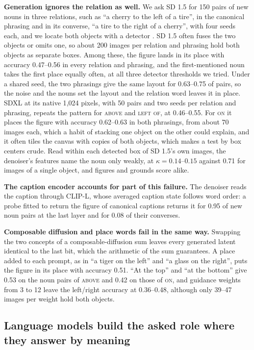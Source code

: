 \documentclass[10pt]{article}
\theoremstyle{plain}
\theoremstyle{remark}
\begin{document}
\textbf{Generation ignores the relation as well.} We ask SD 1.5 for 150 pairs of new nouns in three relations, such as ``a cherry to the left of a tire'', in the canonical phrasing and in its converse, ``a tire to the right of a cherry'', with four seeds each, and we locate both objects with a detector \citep{liu2024groundingdino}. SD 1.5 often fuses the two objects or omits one, so about 200 images per relation and phrasing hold both objects as separate boxes. Among these, the figure lands in its place with accuracy 0.47--0.56 in every relation and phrasing, and the first-mentioned noun takes the first place equally often, at all three detector thresholds we tried. Under a shared seed, the two phrasings give the same layout for 0.63--0.75 of pairs, so the noise and the nouns set the layout and the relation word leaves it in place. SDXL at its native 1{,}024 pixels, with 50 pairs and two seeds per relation and phrasing, repeats the pattern for \textsc{above} and \textsc{left of}, at 0.46--0.55. For \textsc{on} it places the figure with accuracy 0.62--0.63 in both phrasings, from about 70 images each, which a habit of stacking one object on the other could explain, and it often tiles the canvas with copies of both objects, which makes a test by box centers crude. Read within each detected box of SD 1.5's own images, the denoiser's features name the noun only weakly, at $\kappa = 0.14$--$0.15$ against 0.71 for images of a single object, and figures and grounds score alike.

\textbf{The caption encoder accounts for part of this failure.} The denoiser reads the caption through CLIP-L, whose averaged caption state follows word order: a probe fitted to return the figure of canonical captions returns it for 0.95 of new noun pairs at the last layer and for 0.08 of their converses.

\textbf{Composable diffusion and place words fail in the same way.} Swapping the two concepts of a composable-diffusion sum leaves every generated latent identical to the last bit, which the arithmetic of the sum guarantees. A place added to each prompt, as in ``a tiger on the left'' and ``a glass on the right'', puts the figure in its place with accuracy 0.51. ``At the top'' and ``at the bottom'' give 0.53 on the noun pairs of \textsc{above} and 0.42 on those of \textsc{on}, and guidance weights from 3 to 12 leave the left/right accuracy at 0.36--0.48, although only 39--47 images per weight hold both objects.

\subsection{Language models build the asked role where they answer by meaning}
\label{sec:behavior}
\end{document}
